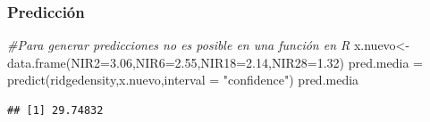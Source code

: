 \documentclass[
]{article}
\newenvironment{Shaded}{\begin{snugshade}}{\end{snugshade}}
\newcommand{\AttributeTok}[1]{\textcolor[rgb]{0.77,0.63,0.00}{#1}}
\newcommand{\CommentTok}[1]{\textcolor[rgb]{0.56,0.35,0.01}{\textit{#1}}}
\newcommand{\FloatTok}[1]{\textcolor[rgb]{0.00,0.00,0.81}{#1}}
\newcommand{\FunctionTok}[1]{\textcolor[rgb]{0.00,0.00,0.00}{#1}}
\newcommand{\NormalTok}[1]{#1}
\newcommand{\OtherTok}[1]{\textcolor[rgb]{0.56,0.35,0.01}{#1}}
\newcommand{\StringTok}[1]{\textcolor[rgb]{0.31,0.60,0.02}{#1}}
\begin{document}
\hypertarget{predicciuxf3n}{%
\subsubsection{Predicción}\label{predicciuxf3n}}

\begin{Shaded}
\begin{Highlighting}[]
\CommentTok{\#Para generar predicciones no es posible en una función en R}
\NormalTok{x.nuevo}\OtherTok{\textless{}{-}} \FunctionTok{data.frame}\NormalTok{(}\AttributeTok{NIR2=}\FloatTok{3.06}\NormalTok{,}\AttributeTok{NIR6=}\FloatTok{2.55}\NormalTok{,}\AttributeTok{NIR18=}\FloatTok{2.14}\NormalTok{,}\AttributeTok{NIR28=}\FloatTok{1.32}\NormalTok{)}
\NormalTok{pred.media }\OtherTok{=} \FunctionTok{predict}\NormalTok{(ridgedensity,x.nuevo,}\AttributeTok{interval =} \StringTok{"confidence"}\NormalTok{)}
\NormalTok{pred.media}
\end{Highlighting}
\end{Shaded}

\begin{verbatim}
## [1] 29.74832
\end{verbatim}
\end{document}
